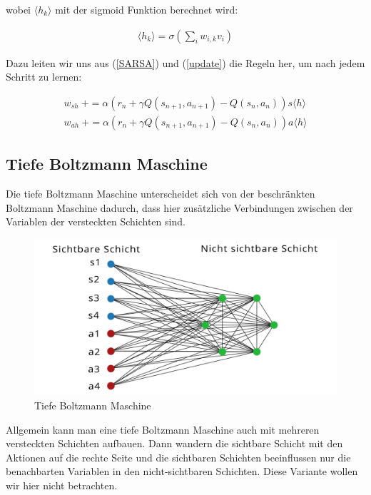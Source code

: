 wobei $\langle h_k \rangle$ mit der sigmoid Funktion berechnet wird:

\begin{align*}
	\langle h_k \rangle = \sigma (\sum_{i}w_{i,k}v_i)
\end{align*}

Dazu leiten wir uns aus (\ref{SARSA}) und (\ref{update}) die Regeln her, um nach jedem Schritt zu lernen:

\begin{align*}
	w_{sh} \:+= \alpha ( r_n + \gamma Q(s_{n+1}, a_{n+1}) -  Q(s_n, a_n) ) s \langle h \rangle \\
	w_{ah} \: += \alpha ( r_n + \gamma Q(s_{n+1}, a_{n+1}) -  Q(s_n, a_n) ) a \langle h \rangle
\end{align*}

\subsection{Tiefe Boltzmann Maschine}
\label{subsec:dbm}

Die tiefe Boltzmann Maschine unterscheidet sich von der beschränkten Boltzmann Maschine dadurch, dass hier zusätzliche Verbindungen zwischen der Variablen der versteckten Schichten sind.

\begin{figure}[hbt!]
\centering
\includegraphics[width=\textwidth]{Figures/dbm.png}
\caption{Tiefe Boltzmann Maschine}
\label{police}
\end{figure}

Allgemein kann man eine tiefe Boltzmann Maschine auch mit mehreren versteckten Schichten aufbauen. Dann wandern die sichtbare Schicht mit den Aktionen auf die rechte Seite und die sichtbaren Schichten beeinflussen nur die benachbarten Variablen in den nicht-sichtbaren Schichten. Diese Variante wollen wir hier nicht betrachten.

